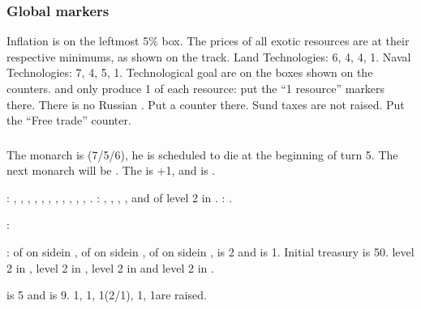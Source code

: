 \subsubsection{Global markers}
\aparag Inflation is on the leftmost 5\% box.
\aparag The prices of all exotic resources are at their respective minimums,
as shown on the track.
\aparag Land Technologies:  6,  4, 
4,  1. Naval Technologies:  7,  4,
 5,  1.
\bparag Technological goal are on the boxes shown on the counters.
\aparag \granderegionKarnatika and \granderegionBengale only produce 1 of each
resource: put the ``1 resource'' markers there.
\aparag There is no Russian \CTZ. Put a counter there.
\aparag Sund taxes are not raised. Put the ``Free trade'' counter.

\subsubsection{\paysmajeurAngleterre}
\aparag The monarch is  (7/5/6), he is scheduled to die at
the beginning of turn 5. The next monarch will be . The
\STAB is +1, and \ANG is .

: \provinceCumberland, \provinceDurham,
\provinceYorkshire, \provinceLancashire, \provinceCymru, \provinceMidlands,
\provinceLincolnshire, , \provinceGloucester,
\provinceCornwall, \provinceWessex, \provinceKent.
: \provinceConnacht, \provinceMumhan,
\provinceLaighean, \provinceBrega, \provinceUladh and \Presidio of level 2 in
\provincePicardie.
: \seazoneAcores.

:
\begin{modlist}
\item[\EG] \paysEcosse
\end{modlist}

:
\bparag \MNU of  on side\facemoins in \provinceMidlands, \MNU of
 on side\facemoins in , \MNU of  on
side\facemoins in \provinceWessex, \FTI is 2 and \DTI is 1.
\bparag Initial treasury is 50\ducats.
\bparag \TradeFLEET level 2 in , level 2 in , level
2 in  and level 2 in .

\aparag {} is 5 and  is
9. 1\ARMY\facemoins, 1\LD, 1\FLEET\facemoins (2\NWD/1\NTD), 1\ND, 1\NTD are
raised.


